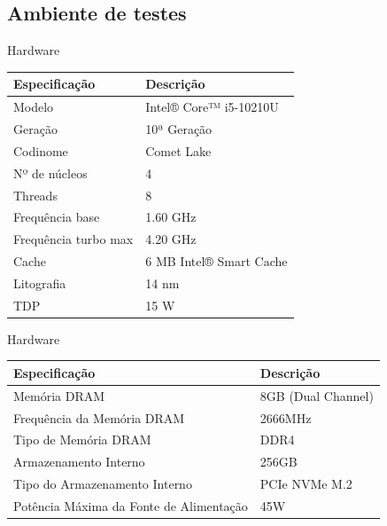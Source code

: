 \subsection{Ambiente de testes}
\begin{frame}{Hardware}
    \centering
    \begin{table}[h]
        \centering
        \begin{tabular}{l|l}
            \textbf{Especificação} & \textbf{Descrição} \\
            \toprule
            Modelo & Intel® Core™ i5-10210U \\
            \hline
            Geração & 10ª Geração \\
            \hline
            Codinome & Comet Lake \\
            \hline
            Nº de núcleos & 4 \\
            \hline
            Threads & 8 \\
            \hline
            Frequência base & 1.60 GHz \\
            \hline
            Frequência turbo max & 4.20 GHz \\
            \hline
            Cache & 6 MB Intel® Smart Cache \\
            \hline
            Litografia & 14 nm \\
            \hline
            TDP & 15 W \\
            \hline
        \end{tabular}
    \end{table}
\end{frame}

\begin{frame}{Hardware}
    \centering
    \begin{table}[h]
        \centering
        \begin{tabular}{l|l}
            \textbf{Especificação} & \textbf{Descrição} \\
            \toprule
            Memória DRAM & 8GB (Dual Channel) \\
            \hline
            Frequência da Memória DRAM & 2666MHz \\
            \hline
            Tipo de Memória DRAM & DDR4 \\
            \hline
            Armazenamento Interno & 256GB \\
            \hline
            Tipo do Armazenamento Interno & PCIe NVMe M.2\\
            \hline
            Potência Máxima da Fonte de Alimentação & 45W\\
        \end{tabular}
    \end{table}
\end{frame}

